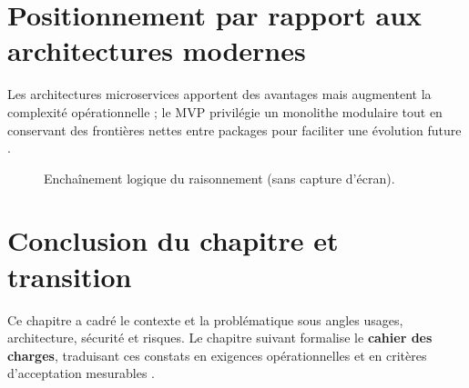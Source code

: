 \section{Positionnement par rapport aux architectures modernes}

Les architectures microservices apportent des avantages mais augmentent la complexité opérationnelle ; le MVP privilégie un monolithe modulaire tout en conservant des frontières nettes entre packages pour faciliter une évolution future \cite{newman2021,bass2021}.

\begin{figure}[H]
  \centering
  \caption{Enchaînement logique du raisonnement (sans capture d'écran).}
  \label{fig:contexte-flow}
\end{figure}

\section{Conclusion du chapitre et transition}

Ce chapitre a cadré le contexte et la problématique sous angles usages, architecture, sécurité et risques. Le chapitre suivant formalise le \textbf{cahier des charges}, traduisant ces constats en exigences opérationnelles et en critères d'acceptation mesurables \cite{pressman2014,sommerville2016}.
